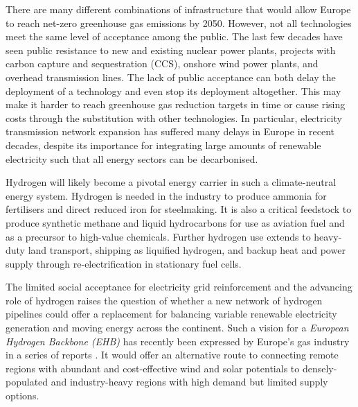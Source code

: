 
There are many different combinations of infrastructure that would allow Europe
to reach net-zero greenhouse gas emissions by 2050. However, not all
technologies meet the same level of acceptance among the public. The last few
decades have seen public resistance to new and existing nuclear power plants,
projects with carbon capture and sequestration (CCS), onshore wind power plants,
and overhead transmission lines. The lack of public acceptance can both delay
the deployment of a technology and even stop its deployment altogether. This may
make it harder to reach greenhouse gas reduction targets in time or cause rising
costs through the substitution with other technologies. In particular,
electricity transmission network expansion has suffered many delays in Europe in
recent decades, despite its importance for integrating large amounts of
renewable electricity such that all energy sectors can be decarbonised.


Hydrogen will likely become a pivotal energy carrier in such a climate-neutral
energy system. Hydrogen is needed in the industry to produce ammonia for
fertilisers and direct reduced iron for steelmaking. It is also a critical
feedstock to produce synthetic methane and liquid hydrocarbons for use as
aviation fuel and as a precursor to high-value chemicals. Further hydrogen use
extends to heavy-duty land transport, shipping as liquified hydrogen, and backup
heat and power supply through re-electrification in stationary fuel cells.


The limited social acceptance for electricity grid reinforcement and the
advancing role of hydrogen raises the question of whether a new network of
hydrogen pipelines could offer a replacement for balancing variable renewable
electricity generation and moving energy across the continent. Such a vision for
a \textit{European Hydrogen Backbone (EHB)} has recently been expressed by
Europe's gas industry in a series of reports
\cite{gasforclimateEuropeanHydrogen2020,gasforclimateEuropeanHydrogen2021,gasforclimateExtendingEuropean2021,gasforclimateEuropeanHydrogen2022}.
It would offer an alternative route to connecting remote regions with abundant
and cost-effective wind and solar potentials to densely-populated and
industry-heavy regions with high demand but limited supply options.

